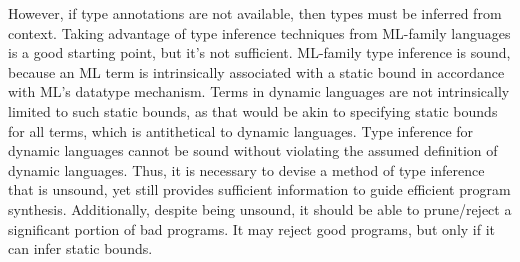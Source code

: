 \documentclass[]{acmart}
\begin{document}
However, if type annotations are not available, then types must be inferred from context. 
Taking advantage of type inference techniques from ML-family languages is a good starting point,
but it's not sufficient. ML-family type inference is sound, because an ML term is 
intrinsically associated with a static bound in accordance with ML's datatype mechanism.
Terms in dynamic languages are not intrinsically limited to such static bounds, as that would be akin
to specifying static bounds for all terms, which is antithetical to dynamic languages. 
Type inference for dynamic languages cannot be sound without violating 
the assumed definition of dynamic languages. 
Thus, it is necessary to devise a method of type inference that is unsound, yet still provides   
sufficient information to guide efficient program synthesis.
Additionally, despite being unsound, it should be able to prune/reject 
a significant portion of bad programs. 
It may reject good programs, but only if it can infer static bounds.









\end{document}
